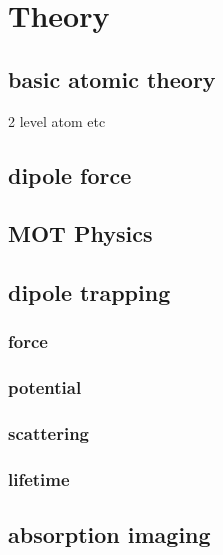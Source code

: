 \chapter{Theory}

\section{basic atomic theory}

2 level atom etc

\section{dipole force}

\section{MOT Physics}

\section{dipole trapping}

    \subsection{force}

    \subsection{potential}

    \subsection{scattering}

    \subsection{lifetime}


\section{absorption imaging}

